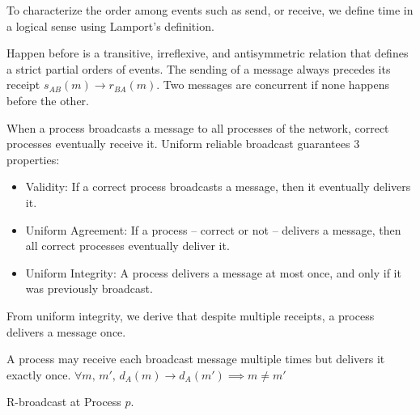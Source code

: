 To characterize the order among events such as send, or receive, we define time
in a logical sense using Lamport’s definition.

\begin{definition}
  Happen before is a transitive, irreflexive, and antisymmetric relation that
  defines a strict partial orders of events. The sending of a message always
  precedes its receipt $s_{AB}(m) \rightarrow r_{BA}(m)$. Two messages are
  concurrent if none happens before the other.
\end{definition}

\begin{definition} 
  When a process broadcasts a message to all processes of the network, correct
  processes eventually receive it. Uniform reliable broadcast guarantees 3
  properties:
  \begin{itemize}[leftmargin=*]
  \item Validity: If a correct process broadcasts a message, then it
    eventually delivers it.
  \item Uniform Agreement: If a process -- correct or not -- delivers a message,
    then all correct processes eventually deliver it.
  \item Uniform Integrity: A process delivers a message at most once, and only if
    it was previously broadcast.
  \end{itemize}
\end{definition}

From uniform integrity, we derive that despite multiple receipts, a process
delivers a message once.

\begin{definition}
  A process may receive each broadcast message multiple times but delivers it
  exactly once.
  $\forall m,\,m',\, d_A(m) \rightarrow d_A(m') \implies m \neq m'$\\
\end{definition}

\begin{algorithm}[h]
  
  \caption{\label{algo:reliablebroadcast}R-broadcast at Process $p$.}
\end{algorithm}

